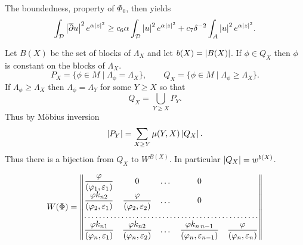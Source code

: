 \documentclass{article}
\begin{document}
The boundedness, property of $\Phi_ 0$, then yields
\[\int_{\mathcal{D}}\left\lvert\overline\partial u\right\rvert^2e^{\alpha\left\lvert z\right\rvert^2}\geq c_6\alpha
\int_{\mathcal{D}}\left\lvert u\right\rvert^2e^{\alpha\left\lvert z\right\rvert^2}
+c_7\delta^{-2}\int_ A\left\lvert u\right\rvert^2e^{\alpha\left\lvert z\right\rvert^2}.\]

Let $B(X)$ be the set of blocks of $\Lambda_{X}$
and let $b(X) = \left\lvert B(X)\right\rvert$. If $\phi \in Q_{X}$ then
$\phi$ is constant on the blocks of $\Lambda_{X}$.
\begin{equation}\label{far-d}
 P_{X} = \{ \phi \in M \mid \Lambda_{\phi} = \Lambda_{X} \},
\qquad
Q_{X} = \{\phi \in M \mid \Lambda_{\phi} \geq \Lambda_{X} \}.
\end{equation}
If $\Lambda_{\phi} \geq \Lambda_{X}$ then
$\Lambda_{\phi} = \Lambda_{Y}$ for some $Y \geq X$ so that
\[ Q_{X} = \bigcup_{Y \geq X} P_{Y}. \]
Thus by M\"obius inversion
\[ \left\lvert P_{Y}\right\rvert= \sum_{X\geq Y} \mu (Y,X)\left\lvert Q_{X}\right\rvert.\]
Thus there is a bijection from $Q_{X}$ to $W^{B(X)}$.
In particular $\left\lvert Q_{X}\right\rvert = w^{b(X)}$.


\renewcommand{\arraystretch}{2.2}
\[W(\Phi)= \begin{Vmatrix}
\dfrac\varphi{(\varphi_1,\varepsilon_1)}&0&\dots&0\\
\dfrac{\varphi k_{n2}}{(\varphi_2,\varepsilon_1)}&
\dfrac\varphi{(\varphi_2,\varepsilon_2)}&\dots&0\\
\hdotsfor{5}\\
\dfrac{\varphi k_{n1}}{(\varphi_n,\varepsilon_1)}&
\dfrac{\varphi k_{n2}}{(\varphi_n,\varepsilon_2)}&\dots&
\dfrac{\varphi k_{n\,n-1}}{(\varphi_n,\varepsilon_{n-1})}&
\dfrac{\varphi}{(\varphi_n,\varepsilon_n)}
\end{Vmatrix}\]





\end{document}
